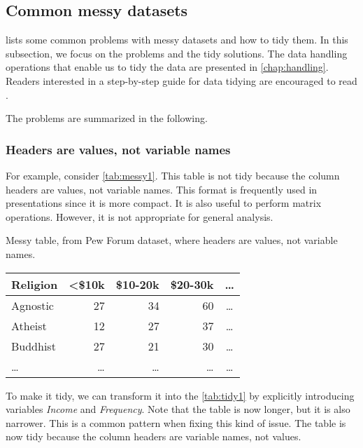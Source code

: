 \subsection{Common messy datasets}
\label{sub:messy}

\textcite{Wickham2014} lists some common problems with messy
datasets and how to tidy them.  In this subsection, we focus on the problems and the
tidy solutions.  The data handling operations that enable us to tidy the data are
presented in \cref{chap:handling}.  Readers interested in a step-by-step guide for data
tidying are encouraged to read \textcite{Wickham2023}.

The problems are summarized in the following.

\clearpage
\subsubsection{Headers are values, not variable names}  For example, consider
\cref{tab:messy1}.  This table is not tidy because the column headers are values, not
variable names.  This format is frequently used in presentations since it is more compact.
It is also useful to perform matrix operations. However, it is not appropriate for general
analysis.

\begin{tablebox}[label=tab:messy1]{Messy table, from Pew Forum dataset, where headers are values, not variable names.}
  \centering
  \begin{tabular}{l r r r c}
    \toprule
    \textbf{Religion} & \textbf{<\$10k} & \textbf{\$10-20k} & \textbf{\$20-30k} & \textbf{\dots} \\
    \midrule
    Agnostic & 27 & 34 & 60 & \dots \\
    Atheist & 12 & 27 & 37 & \dots \\
    Buddhist & 27 & 21 & 30 & \dots \\
    \dots & \dots & \dots & \dots & \dots \\
    \bottomrule
  \end{tabular}
\end{tablebox}

To make it tidy, we can transform it into the \cref{tab:tidy1} by explicitly introducing
variables \emph{Income} and \emph{Frequency}.
Note that the table is now longer, but it is also narrower.  This is a common pattern when
fixing this kind of issue.  The table is now tidy because the column headers are variable
names, not values.

